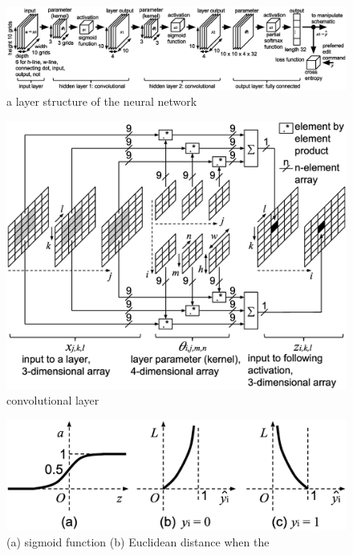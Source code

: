 \documentclass[twocolumn]{article}
\begin{document}
\begin{figure}[!tp]
 \begin{center}
  \begin{minipage}{\hsize}
   \includegraphics[width=\hsize]{fig/layers_06.eps}
   \caption{a layer structure of the neural network}
   \label{fig:layers}
  \end{minipage}
 \end{center}
\end{figure}

\begin{figure}[!tb]
 \begin{center}
  \begin{minipage}{\hsize}
   \includegraphics[width=\hsize]{fig/layer_convolutional_03.eps}
   \caption{convolutional layer}
   \label{fig:layer_convolutional}
  \end{minipage}
 \end{center}
\end{figure}

\begin{figure}[!tb]
 \begin{center}
  \begin{minipage}{\hsize}
   \includegraphics[width=\hsize]{fig/curves_03.eps}
   \caption{(a) sigmoid function
    (b) Euclidean distance when the}
   \label{fig:curves}
  \end{minipage}
 \end{center}
\end{figure}
\end{document}
